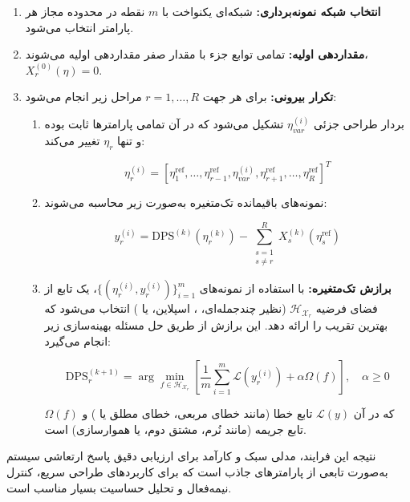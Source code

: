 \begin{enumerate}
  \item \textbf{انتخاب شبکه نمونه‌برداری:} شبکه‌ای یکنواخت با $m$ نقطه در محدوده مجاز هر پارامتر انتخاب می‌شود.
  \item \textbf{مقداردهی اولیه:} تمامی توابع جزء با مقدار صفر مقداردهی اولیه می‌شوند، $X_r^{(0)}(\eta) = 0$.
  \item \textbf{تکرار بیرونی:} برای هر جهت $r = 1,\ldots,R$ مراحل زیر انجام می‌شود:
  \begin{enumerate}
    \item بردار طراحی جزئی $\eta_{var}^{(i)}$ تشکیل می‌شود که در آن تمامی پارامترها ثابت بوده و تنها $\eta_r$ تغییر می‌کند:

    \begin{equation}
    \eta_r^{(i)} = \left[ \eta_1^{\mathrm{ref}}, \ldots, \eta_{r-1}^{\mathrm{ref}}, \eta_{var}^{(i)}, \eta_{r+1}^{\mathrm{ref}}, \ldots, \eta_R^{\mathrm{ref}} \right]^T
    \end{equation}

    \item نمونه‌های باقیمانده تک‌متغیره به‌صورت زیر محاسبه می‌شوند:

    \begin{equation}
    y_r^{(i)} = \mathrm{DPS}^{(k)}(\eta_r^{(k)}) - \sum_{\substack{s=1\\s\ne r}}^R X_s^{(k)}(\eta_s^{\mathrm{ref}})
    \end{equation}

    \item \textbf{برازش تک‌متغیره:} با استفاده از نمونه‌های $\{(\eta_r^{(i)}, y_r^{(i)})\}_{i=1}^m$، یک تابع از فضای فرضیه $\mathcal{H}_{\mathcal{X}_r}$ (نظیر چندجمله‌ای، ، اسپلاین، یا ) انتخاب می‌شود که بهترین تقریب را ارائه دهد. این برازش از طریق حل مسئله بهینه‌سازی زیر انجام می‌گیرد:

    \begin{equation}
    \mathrm{DPS}_r^{(k+1)} = \arg\min_{f \in \mathcal{H}_{\mathcal{X}_r}} \left[ \frac{1}{m} \sum_{i=1}^{m} \mathcal{L}(y_r^{(i)}) + \alpha \Omega(f) \right], \quad \alpha \geq 0
    \end{equation}

    که در آن $\mathcal{L}(y)$ تابع خطا (مانند خطای مربعی، خطای مطلق یا ) و $\Omega(f)$ تابع جریمه (مانند نُرم، مشتق دوم، یا هموارسازی) است.
  \end{enumerate}
\end{enumerate}
نتیجه این فرایند، مدلی سبک و کارآمد برای ارزیابی دقیق پاسخ ارتعاشی سیستم به‌صورت تابعی از پارامترهای جاذب است که برای کاربردهای طراحی سریع، کنترل نیمه‌فعال و تحلیل حساسیت بسیار مناسب است.
